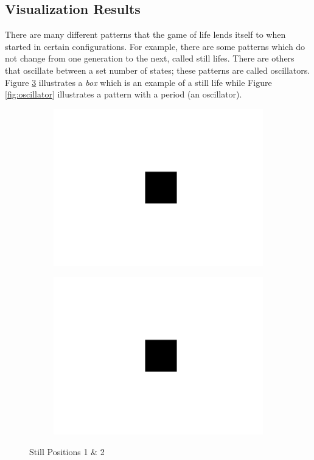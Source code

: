 \documentclass[11pt]{article}
\begin{document}
\subsection{Visualization Results}
There are many different patterns that the game of life lends itself to when started in certain configurations.  For example, there are some patterns which do not change from one generation to the next, called still lifes.  There are others that oscillate between a set number of states; these patterns are called oscillators.  Figure \ref{fig:still} illustrates a \textit{box} which is an example of a still life while Figure \ref{fig:oscillator} illustrates a pattern with a period (an oscillator).
\begin{figure}[!ht]
	\centering
	\begin{subfigure}{.45\textwidth}
		\centering
  	  	\includegraphics[width=1\linewidth]{images/box.png}
  	  	\label{fig:box1}
	\end{subfigure}
	\begin{subfigure}{.45\textwidth}
  	  	\centering
  	  	\includegraphics[width=1\linewidth]{images/box.png}
  	  	\label{fig:box2}
	\end{subfigure}
	\caption{Still Positions 1 \& 2}
	\label{fig:still}
\end{figure}
\end{document}
